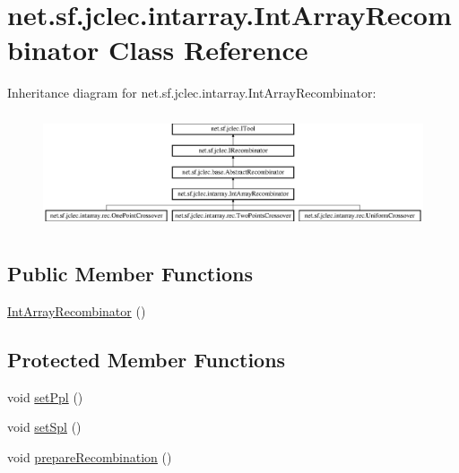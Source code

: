 \hypertarget{classnet_1_1sf_1_1jclec_1_1intarray_1_1_int_array_recombinator}{\section{net.\-sf.\-jclec.\-intarray.\-Int\-Array\-Recombinator Class Reference}
\label{classnet_1_1sf_1_1jclec_1_1intarray_1_1_int_array_recombinator}
}
Inheritance diagram for net.\-sf.\-jclec.\-intarray.\-Int\-Array\-Recombinator\-:\begin{figure}[H]
\begin{center}
\leavevmode
\includegraphics[height=3.418803cm]{classnet_1_1sf_1_1jclec_1_1intarray_1_1_int_array_recombinator}
\end{center}
\end{figure}
\subsection*{Public Member Functions}
\begin{DoxyCompactItemize}
\item 
\hyperlink{classnet_1_1sf_1_1jclec_1_1intarray_1_1_int_array_recombinator_a6bb39bbcb5efbd405b0e15b94ca1cb18}{Int\-Array\-Recombinator} ()
\end{DoxyCompactItemize}
\subsection*{Protected Member Functions}
\begin{DoxyCompactItemize}
\item 
void \hyperlink{classnet_1_1sf_1_1jclec_1_1intarray_1_1_int_array_recombinator_a12ec5d6552bde26c176f44c96c0c5621}{set\-Ppl} ()
\item 
void \hyperlink{classnet_1_1sf_1_1jclec_1_1intarray_1_1_int_array_recombinator_ab2bc910adebd5e4b8ca23f53e920c147}{set\-Spl} ()
\item 
void \hyperlink{classnet_1_1sf_1_1jclec_1_1intarray_1_1_int_array_recombinator_a717ae2d9111d2fb9bd98fceaf0546a99}{prepare\-Recombination} ()
\end{DoxyCompactItemize}
